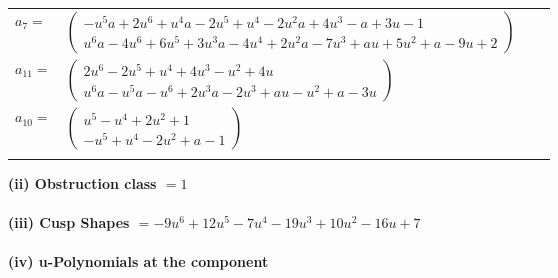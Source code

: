 \documentclass[1p]{elsarticle_modified}
\theoremstyle{definition}
\begin{document}
\begin{tabular}{m{7pt} m{180pt} m{7pt} m{180pt} }
\flushright $a_{7}=$&$\begin{pmatrix}- u^5 a+2 u^6+u^4 a-2 u^5+u^4-2 u^2 a+4 u^3- a+3 u-1\\u^6 a-4 u^6+6 u^5+3 u^3 a-4 u^4+2 u^2 a-7 u^3+a u+5 u^2+a-9 u+2\end{pmatrix}$ \\
\flushright $a_{11}=$&$\begin{pmatrix}2 u^6-2 u^5+u^4+4 u^3- u^2+4 u\\u^6 a- u^5 a- u^6+2 u^3 a-2 u^3+a u- u^2+a-3 u\end{pmatrix}$ \\
\flushright $a_{10}=$&$\begin{pmatrix}u^5- u^4+2 u^2+1\\- u^5+u^4-2 u^2+a-1\end{pmatrix}$\\&\end{tabular}
\flushleft \textbf{(ii) Obstruction class $= 1$}\\~\\
\flushleft \textbf{(iii) Cusp Shapes $= -9 u^6+12 u^5-7 u^4-19 u^3+10 u^2-16 u+7$}\\~\\
\newpage\renewcommand{\arraystretch}{1}
\flushleft \textbf{(iv) u-Polynomials at the component}\newline \\
\end{document}
